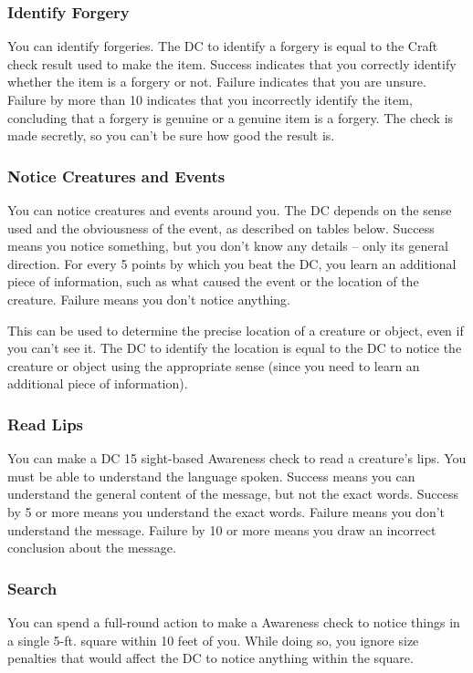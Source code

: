 \subsubsection{Identify Forgery}
You can identify forgeries. The DC to identify a forgery is equal to the Craft check result used to make the item. Success indicates that you correctly identify whether the item is a forgery or not. Failure indicates that you are unsure. Failure by more than 10 indicates that you incorrectly identify the item, concluding that a forgery is genuine or a genuine item is a forgery. The check is made secretly, so you can't be sure how good the result is.

\subsubsection{Notice Creatures and Events}
You can notice creatures and events around you. The DC depends on the sense used and the obviousness of the event, as described on tables below. Success means you notice something, but you don't know any details -- only its general direction. For every 5 points by which you beat the DC, you learn an additional piece of information, such as what caused the event or the location of the creature. Failure means you don't notice anything.

This can be used to determine the precise location of a creature or object, even if you can't see it. The DC to identify the location is equal to the DC to notice the creature or object using the appropriate sense  (since you need to learn an additional piece of information).

\subsubsection{Read Lips}
You can make a DC 15 sight-based Awareness check to read a creature's lips. You must be able to understand the language spoken. Success means you can understand the general content of the message, but not the exact words. Success by 5 or more means you understand the exact words. Failure means you don't understand the message. Failure by 10 or more means you draw an incorrect conclusion about the message.

\subsubsection{Search}\label{Search}
You can spend a full-round action to make a Awareness check to notice things in a single 5-ft. square within 10 feet of you. While doing so, you ignore size penalties that would affect the DC to notice anything within the square.

